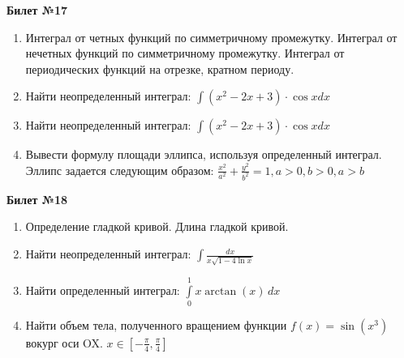 \documentclass[a4paper, 12pt]{article}
\begin{document}
\begin{center}
	\textbf{Билет №17}
\end{center}
\begin{enumerate}
	\item Интеграл от четных функций по симметричному промежутку.
	Интеграл от нечетных функций по симметричному промежутку.
	Интеграл от периодических функций на отрезке, кратном периоду.
	\item Найти неопределенный интеграл: $\displaystyle \int{(x^2 - 2x + 3) \cdot \cos x dx}$
	\item Найти неопределенный интеграл: $\displaystyle \int{(x^2 - 2x + 3) \cdot \cos x dx}$
	\item Вывести формулу площади эллипса, используя определенный интеграл. Эллипс задается следующим образом: $\displaystyle \frac{x^2}{a^2} + \frac{y^2}{b^2} = 1, a > 0, b > 0, a > b$
\end{enumerate}

\begin{center}
	\textbf{Билет №18}
\end{center}
\begin{enumerate}
	\item Определение гладкой кривой. Длина гладкой кривой.
	\item Найти неопределенный интеграл: $\displaystyle \int{\frac{dx}{x \sqrt{1 - 4 \ln x}}}$
	\item Найти определенный интеграл: $\displaystyle \int\limits_{0}^{1} x \arctan(x)\,dx$
	\item Найти объем тела, полученного вращением функции $f(x) = \sin(x^3)$ вокург оси OX. $x\in\left[-\frac{\pi}{4},\frac{\pi}{4}\right]$ 
\end{enumerate}
\end{document}
